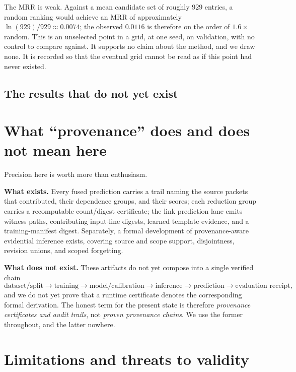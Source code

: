 \documentclass[11pt]{article}
\begin{document}


The MRR is weak. Against a mean candidate set of roughly $929$ entries, a
random ranking would achieve an MRR of approximately $\ln(929)/929 \approx
0.0074$; the observed $0.0116$ is therefore on the order of $1.6\times$ random.
This is an unselected point in a grid, at one seed, on validation, with no
control to compare against. It supports no claim about the method, and we draw
none. It is recorded so that the eventual grid cannot be read as if this point
had never existed.

\subsection{The results that do not yet exist}





\section{What ``provenance'' does and does not mean here}\label{sec:provenance}

Precision here is worth more than enthusiasm.

\textbf{What exists.} Every fused prediction carries a trail naming the source
packets that contributed, their dependence groups, and their scores; each
reduction group carries a recomputable count/digest certificate; the link
prediction lane emits witness paths, contributing input-line digests, learned
template evidence, and a training-manifest digest. Separately, a formal
development of provenance-aware evidential inference exists, covering source and
scope support, disjointness, revision unions, and scoped forgetting.

\textbf{What does not exist.} These artifacts do not yet compose into a single
verified chain
\[
  \text{dataset/split} \to \text{training} \to \text{model/calibration}
  \to \text{inference} \to \text{prediction} \to \text{evaluation receipt},
\]
and we do not yet prove that a runtime certificate denotes the corresponding
formal derivation. The honest term for the present state is therefore
\emph{provenance certificates and audit trails}, not \emph{proven provenance
chains}. We use the former throughout, and the latter nowhere.

\section{Limitations and threats to validity}\label{sec:limits}
\end{document}
